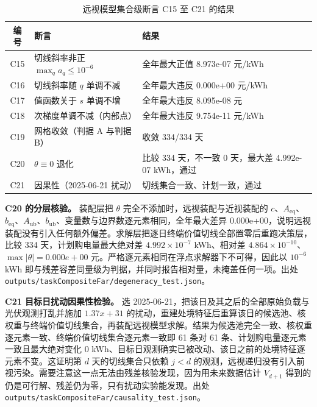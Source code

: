 \begin{appendices}
\begin{table}[htbp]
  \centering
  \small
  \caption{远视模型集合级断言 C15 至 C21 的结果}
  \label{tab:appendix-c15-21}
  \begin{tabularx}{\textwidth}{@{}c L L@{}}
    \toprule
    编号 & 断言 & 结果 \\
    \midrule
    C15 & 切线斜率非正 $\max_qa_q\le10^{-6}$ & 全年最大正值 8.973e-07 元/kWh \\
    C16 & 切线斜率随 $q$ 单调不减 & 全年最大违反 0.000e+00 元/kWh \\
    C17 & 值函数关于 $s$ 单调不增 & 全年最大违反 8.095e-08 元 \\
    C18 & 次梯度单调不减（内部点） & 全年最大违反 9.754e-11 元/kWh \\
    C19 & 网格收敛（判据 A 与判据 B） & 收敛 334/334 天 \\
    C20 & $\theta\equiv0$ 退化 & 比较 334 天，不一致 0 天，最大差 4.992e-07 kWh，通过 \\
    C21 & 因果性（2025-06-21 扰动） & 切线集合一致、计划一致，通过 \\
    \bottomrule
  \end{tabularx}
\end{table}

\textbf{C20 的分层核验。} 装配层把 $\theta$ 完全不添加时，远视装配与近视装配的 $c$、$A_{\mathrm{eq}}$、$b_{\mathrm{eq}}$、$A_{\mathrm{ub}}$、$b_{\mathrm{ub}}$、变量数与边界数逐元素相同，全年最大差异 0.000e+00，说明远视装配没有引入任何额外偏差。求解层把逐日终端价值切线全部置零后重跑决策层，比较 334 天，计划购电量最大绝对差 $4.992\times10^{-7}$ kWh、相对差 $4.864\times10^{-10}$、$\max\lvert\theta\rvert=0.000e+00$ 元。严格逐元素相同在浮点求解器下不可得，因此以 $10^{-6}$ kWh 即与残差容差同量级为判据，并同时报告相对量，未掩盖任何一项。出处 \texttt{outputs/\allowbreak taskCompositeFar/\allowbreak degeneracy\_test.json}。

\textbf{C21 目标日扰动因果性检验。} 选 2025-06-21，把该日及其之后的全部原始负载与光伏观测打乱并施加 $1.37x+31$ 的扰动，重建处境特征后重算该日的候选池、核权重与终端价值切线集合，再装配远视模型求解。结果为候选池完全一致、核权重逐元素一致、终端价值切线集合逐元素一致即 61 条对 61 条、计划购电量逐元素一致且最大绝对变化 0 kWh、目标日观测确实已被改动、该日之前的处境特征逐元素不变。这证明第 $d$ 天的切线集合只依赖 $j<d$ 的观测，远视递归没有引入前视污染。需要注意这一点无法由残差核验发现，因为用未来数据估计 $V_{d+1}$ 得到的仍是可行解、残差仍为零，只有扰动实验能发现。出处 \texttt{outputs/\allowbreak taskCompositeFar/\allowbreak causality\_test.json}。


\end{appendices}
